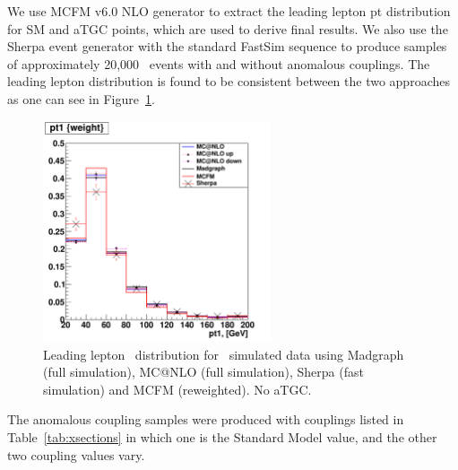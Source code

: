 We use MCFM v6.0 NLO generator to extract the leading lepton pt
distribution for SM and aTGC points, which are used to derive final
results. We also use the Sherpa event generator with the standard
FastSim sequence to produce samples of approximately 20,000 \ww\
events with and without anomalous couplings.  The leading lepton
distribution is found to be consistent between the two approaches as
one can see in Figure~\ref{fig:generator_comparison}.
\begin{figure}[tp]
  \centerline{
    \includegraphics[width=0.6\textwidth]{figures/generator_comparison.pdf}
  }

  \caption[Generator comparison]{Leading lepton \pt\ distribution
  for \WW\ simulated data using Madgraph (full simulation), MC@NLO (full simulation),
  Sherpa (fast simulation) and MCFM (reweighted). No aTGC.}

  \label{fig:generator_comparison}
\end{figure}

The anomalous coupling samples were produced with couplings listed in
Table~\ref{tab:xsections} in which one is the Standard Model value,
and the other two coupling values vary.
